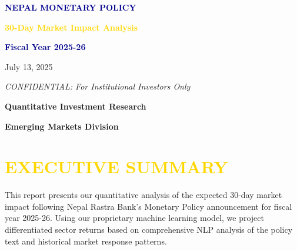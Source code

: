 \documentclass{article} \usepackage[utf8]{inputenc} \usepackage{graphicx} \usepackage{xcolor} \usepackage{titlesec} \usepackage{booktabs} \usepackage{multicol} \usepackage{amsmath} \usepackage{amssymb} \usepackage{enumitem} \usepackage{hyperref} \usepackage{float} \usepackage[margin=1in]{geometry} \usepackage{fancyhdr} \usepackage{tikz} \usepackage{pgfplots}
\begin{document}
\begin{titlepage} \begin{center} \vspace*{1cm} %

\vspace{1.5cm} {\Huge\bfseries\textcolor{darkblue}{NEPAL MONETARY POLICY}\par} \vspace{0.5cm} {\huge\bfseries\textcolor{gold}{30-Day Market Impact Analysis}\par} \vspace{0.5cm} {\huge\bfseries\textcolor{darkblue}{Fiscal Year 2025-26}\par}

\vspace{2cm} {\large July 13, 2025\par} \vspace{1cm} {\Large\itshape CONFIDENTIAL: For Institutional Investors Only\par}

\vfill {\large\textbf{Quantitative Investment Research}\par} {\large\textbf{Emerging Markets Division}\par} \end{center} \end{titlepage}

\section*{\textcolor{gold}{EXECUTIVE SUMMARY}}

This report presents our quantitative analysis of the expected 30-day market impact following Nepal Rastra Bank's Monetary Policy announcement for fiscal year 2025-26. Using our proprietary machine learning model, we project differentiated sector returns based on comprehensive NLP analysis of the policy text and historical market response patterns.
\end{document}
